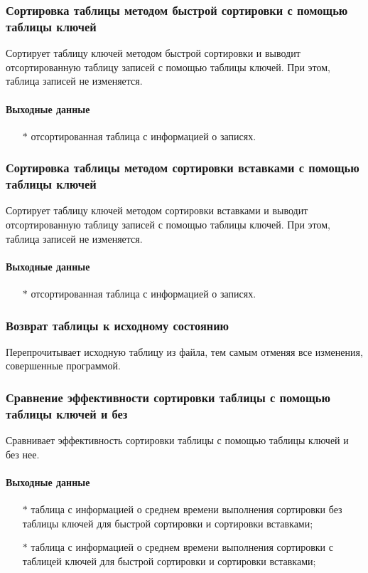 \documentclass[a4paper,12pt]{extarticle}
\begin{document}
\subsubsection{Сортировка таблицы методом быстрой сортировки с помощью таблицы ключей}
Сортирует таблицу ключей методом быстрой сортировки и выводит отсортированную таблицу записей с помощью таблицы ключей. При этом, таблица записей не изменяется. 

\paragraph{Выходные данные}
\begin{itemize}
    \item[$*$] отсортированная таблица с информацией о записях.
\end{itemize}

\subsubsection{Сортировка таблицы методом сортировки вставками с помощью таблицы ключей}
Сортирует таблицу ключей методом сортировки вставками и выводит отсортированную таблицу записей с помощью таблицы ключей. При этом, таблица записей не изменяется. 

\paragraph{Выходные данные}
\begin{itemize}
    \item[$*$] отсортированная таблица с информацией о записях.
\end{itemize}

\subsubsection{Возврат таблицы к исходному состоянию}
Перепрочитывает исходную таблицу из файла, тем самым отменяя все изменения, совершенные программой.

\subsubsection{Сравнение эффективности сортировки таблицы с помощью таблицы ключей и без}
Сравнивает эффективность сортировки таблицы с помощью таблицы ключей и без нее.

\paragraph{Выходные данные}
\begin{itemize}
    \item[$*$] таблица с информацией о среднем времени выполнения сортировки без таблицы ключей для быстрой сортировки и сортировки вставками;
    \item[$*$] таблица с информацией о среднем времени выполнения сортировки с таблицей ключей для быстрой сортировки и сортировки вставками;
\end{itemize}
\end{document}
